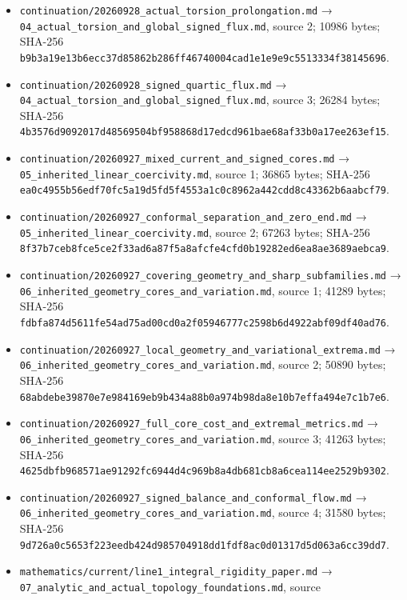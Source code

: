 \documentclass[
  10pt,
]{article}
\begin{document}
\begin{itemize}
  14728 bytes; SHA-256
  \nolinkurl{3d107164ea9ad11df362c287222cd700747c92aba155c32baafdab6daf892329}.
\item
  \nolinkurl{continuation/20260928_actual_torsion_prolongation.md} →
  \nolinkurl{04_actual_torsion_and_global_signed_flux.md}, source 2;
  10986 bytes; SHA-256
  \nolinkurl{b9b3a19e13b6ecc37d85862b286ff46740004cad1e1e9e9c5513334f38145696}.
\item
  \nolinkurl{continuation/20260928_signed_quartic_flux.md} →
  \nolinkurl{04_actual_torsion_and_global_signed_flux.md}, source 3;
  26284 bytes; SHA-256
  \nolinkurl{4b3576d9092017d48569504bf958868d17edcd961bae68af33b0a17ee263ef15}.
\item
  \nolinkurl{continuation/20260927_mixed_current_and_signed_cores.md}
  → \nolinkurl{05_inherited_linear_coercivity.md}, source 1; 36865
  bytes; SHA-256
  \nolinkurl{ea0c4955b56edf70fc5a19d5fd5f4553a1c0c8962a442cdd8c43362b6aabcf79}.
\item
  \nolinkurl{continuation/20260927_conformal_separation_and_zero_end.md}
  → \nolinkurl{05_inherited_linear_coercivity.md}, source 2; 67263
  bytes; SHA-256
  \nolinkurl{8f37b7ceb8fce5ce2f33ad6a87f5a8afcfe4cfd0b19282ed6ea8ae3689aebca9}.
\item
  \nolinkurl{continuation/20260927_covering_geometry_and_sharp_subfamilies.md}
  → \nolinkurl{06_inherited_geometry_cores_and_variation.md}, source
  1; 41289 bytes; SHA-256
  \nolinkurl{fdbfa874d5611fe54ad75ad00cd0a2f05946777c2598b6d4922abf09df40ad76}.
\item
  \nolinkurl{continuation/20260927_local_geometry_and_variational_extrema.md}
  → \nolinkurl{06_inherited_geometry_cores_and_variation.md}, source
  2; 50890 bytes; SHA-256
  \nolinkurl{68abdebe39870e7e984169eb9b434a88b0a974b98da8e10b7effa494e7c1b7e6}.
\item
  \nolinkurl{continuation/20260927_full_core_cost_and_extremal_metrics.md}
  → \nolinkurl{06_inherited_geometry_cores_and_variation.md}, source
  3; 41263 bytes; SHA-256
  \nolinkurl{4625dbfb968571ae91292fc6944d4c969b8a4db681cb8a6cea114ee2529b9302}.
\item
  \nolinkurl{continuation/20260927_signed_balance_and_conformal_flow.md}
  → \nolinkurl{06_inherited_geometry_cores_and_variation.md}, source
  4; 31580 bytes; SHA-256
  \nolinkurl{9d726a0c5653f223eedb424d985704918dd1fdf8ac0d01317d5d063a6cc39dd7}.
\item
  \nolinkurl{mathematics/current/line1_integral_rigidity_paper.md} →
  \nolinkurl{07_analytic_and_actual_topology_foundations.md}, source

\end{itemize}
\end{document}
